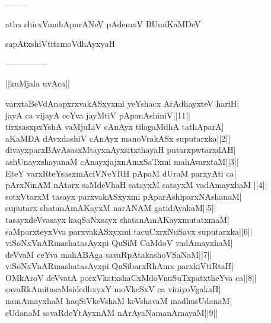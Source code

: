 \documentclass{article}
\begin{document}
\begin{center}
--------
\end{center}

\begin{center}
atha shirxVmahApurANeV pAdemxV BUmiKaMDeV
\end{center}

\begin{center}
sapAtxshiVtitamoVdhAyxyaH
\end{center}

\begin{center}
---------------
\end{center}

\begin{center}
||kuMjala uvAca||
\end{center}

varxtaBeVdAnapxrxvakASxyxmi yeYshacx ArAdhayxteV hariH|\\
jayA ca vijayA ceYva jayMtiV pApanAshiniV||11||\\
tirxsasxpxYshA vaMjuLiV cAnAyx tilagaMdhA tathAparA|\\
aKaMDA dAvxdashiV cAnAyx manoVrakASx suputarxka||2||\\
divayxparxBAvAsasxMtayxnAyxsitxthayaH putarxpwtarxdAH|\\
ashUnayxshayanaM cAnayxjajxnAmxSaTxmi mahAvarxtaM||3||\\
EteY varxRteYsasxmAciVNeYRH pApaM dUraM parxyAti ca|\\
pArxNinAM nAtarx saMdeVhaH satayxM satayxM vadAmayxhaM ||4||\\
sotxVtarxM tasayx parxvakASxyxmi pAparAshiparxNAshanaM|\\
suputarx shatanAmAKayxM narANAM gatidAyakaM||5||\\
tasayxdeVvasayx kaqSaNxsayx shatanAmAKayxmutatxmaM|\\
saMparxteyxVva parxvakASxyxmi tacuCxrxNuSavx suputarxka||6||\\
viSoNxVnARmashatasAyxpi QuSiM CaMdoV vadAmayxhaM|\\
deVvaM ceYva mahABAga savaRpAtakashoVSaNaM||7||\\
viSoNxVnARmashatasAyxpi QuSibarxRhAmx parxkiVtiRtaH|\\
OMkAroV deVvatA porxVkatxshaCxMdoVnuSuTxpatxtheYva ca||8||\\
savaRkAmitasaMsidedhxyxY moVkeSxV ca viniyoVgakaH|\\
namAmayxhaM haqSiVkeVshaM keVshavaM madhusUdanaM|\\
sUdanaM savaRdeYtAyxnAM nArAyaNamanAmayaM||9||\\
\end{document}
